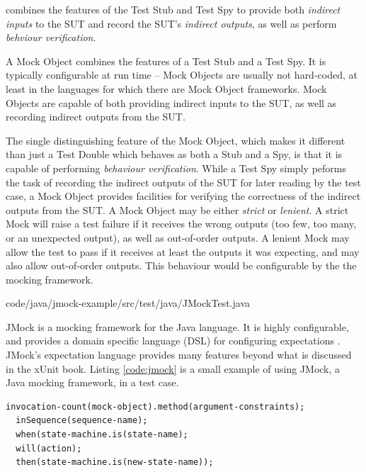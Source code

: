  combines the features of the Test Stub and
Test Spy to provide both \textit{indirect inputs} to the SUT and
record the SUT's \textit{indirect outputs}, as well as perform
\textit{behviour verification}.

A Mock Object combines the features of a Test Stub and a Test Spy. It
is typically configurable at run time -- Mock Objects are usually not
hard-coded, at least in the languages for which there are Mock Object
frameworks. Mock Objects are capable of both providing indirect inputs
to the SUT, as well as recording indirect outputs from the SUT.

The single distinguishing feature of the Mock Object, which makes it
different than just a Test Double which behaves as both a Stub and a
Spy, is that it is capable of performing \textit{behaviour
  verification}. While a Test Spy simply peforms the task of recording
the indirect outputs of the SUT for later reading by the test case, a
Mock Object provides facilities for verifying the correctness of the
indirect outputs from the SUT. A Mock Object may be either
\textit{strict} or \textit{lenient}. A strict Mock will raise a test
failure if it receives the wrong outputs (too few, too many, or an
unexpected output), as well as out-of-order outputs. A lenient Mock
may allow the test to pass if it receives at least the outputs it was
expecting, and may also allow out-of-order outputs. This behaviour
would be configurable by the the mocking framework.

 {code/java/jmock-example/src/test/java/JMockTest.java}

JMock is a mocking framework for the Java language. It is highly
configurable, and provides a domain specific language (DSL) for
configuring expectations \cite{freeman:evolving}. JMock's
expectation language provides many features beyond what is discussed
in the xUnit book. Listing \ref{code:jmock} is a small example of
using JMock, a Java mocking framework, in a test case.

\footnotesize
\begin{verbatim}
invocation-count(mock-object).method(argument-constraints);
  inSequence(sequence-name);
  when(state-machine.is(state-name);
  will(action);
  then(state-machine.is(new-state-name));
\end{verbatim}
\normalsize

